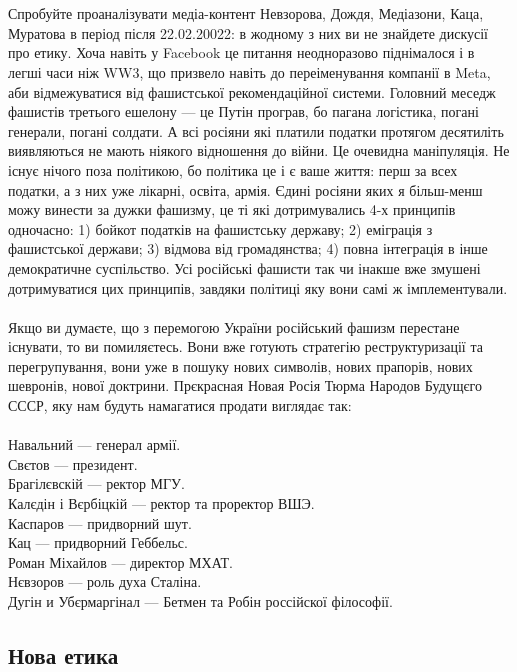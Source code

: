 \\
\\
Спробуйте проаналізувати медіа-контент Невзорова, Дождя, Медіазони, Каца, Муратова в період після 22.02.20022: в жодному з них ви не знайдете дискусії про етику. Хоча навіть у Facebook це питання неодноразово піднімалося і в легші часи ніж WW3, що призвело навіть до переіменування компанії в Meta, аби відмежуватися від фашистської рекомендаційної системи. Головний меседж фашистів третього ешелону — це Путін програв, бо пагана логістика, погані генерали, погані солдати. А всі росіяни які платили податки протягом десятиліть виявляються не мають ніякого відношення до війни. Це очевидна маніпуляція. Не існує нічого поза політикою, бо політика це і є ваше життя: перш за всех податки, а з них уже лікарні, освіта, армія. Єдині росіяни яких я більш-менш можу винести за дужки фашизму, це ті які дотримувались 4-х принципів одночасно: 1) бойкот податків на фашистську державу; 2) еміграція з фашистської держави; 3) відмова від громадянства; 4) повна інтеграція в інше демократичне суспільство. Усі російські фашисти так чи інакше вже змушені дотримуватися цих принципів, завдяки політиці яку вони самі ж імплементували.
\\
\\
Якщо ви думаєте, що з перемогою України російський фашизм перестане існувати, то ви помиляєтесь. Вони вже готують стратегію реструктуризації та перегрупування, вони уже в пошуку нових символів, нових прапорів, нових шевронів, нової доктрини. Прєкрасная Новая Росія Тюрма Народов Будущєго СССР, яку нам будуть намагатися продати виглядає так:
\\
\\
Навальний — генерал армії.\\
Свєтов — президент.\\
Брагілєвскій — ректор МГУ.\\
Калєдін і Вєрбіцкій — ректор та проректор ВШЭ.\\
Каспаров — придворний шут.\\
Кац — придворний Геббельс.\\
Роман Міхайлов — директор МХАТ.\\
Нєвзоров — роль духа Сталіна.\\
Дугін и Убєрмаргінал — Бетмен та Робін россійскої філософії.\\

\subsection{Нова етика}

